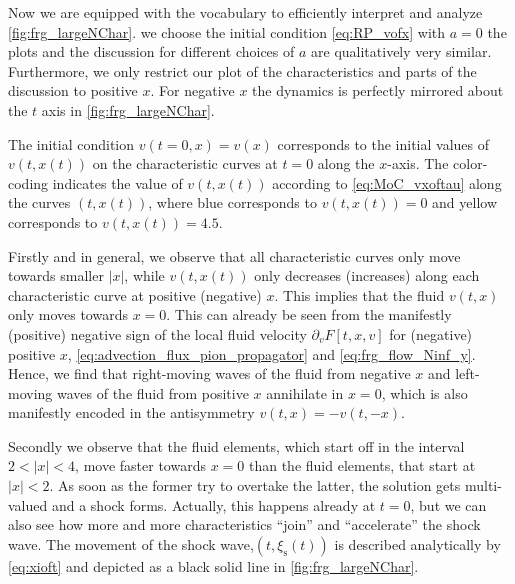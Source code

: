 Now we are equipped with the vocabulary to efficiently interpret and analyze \cref{fig:frg_largeNChar}.
\WlogA{} we choose the initial condition \eqref{eq:RP_vofx} with $a = 0$ \dash{} the plots and the discussion for different choices of $a$ are qualitatively very similar.
Furthermore, we only restrict our plot of the characteristics and parts of the discussion to positive $x$. For negative $x$ the dynamics is perfectly mirrored about the $t$ axis in \cref{fig:frg_largeNChar}.

The initial condition $v ( t = 0, x ) = v ( x )$ corresponds to the initial values of $v ( t, x ( t ) )$ on the characteristic curves at $t = 0$ along the $x$-axis. The color-coding indicates the value of $v ( t, x ( t ) )$ according to \cref{eq:MoC_vxoftau} along the curves $( t, x ( t ) )$, where {blue} corresponds to $v ( t, x ( t ) ) = 0$ and {yellow} corresponds to $v ( t, x ( t ) ) = 4.5$. 

Firstly and in general, we observe that all characteristic curves only move towards smaller $| x |$, while $v ( t, x ( t ) )$ only decreases (increases) along each characteristic curve at positive (negative) $x$. This implies that the fluid $v ( t, x)$ only moves towards $x = 0$. This can already be seen from the manifestly (positive) negative sign of the local fluid velocity $\partial_v F [ t, x, v ]$ for (negative) positive $x$, \cf{} \cref{eq:advection_flux_pion_propagator} and \cref{eq:frg_flow_Ninf_y}. Hence, we find that right-moving waves of the fluid from negative $x$ and left-moving waves of the fluid from positive $x$ annihilate in $x = 0$, which is also manifestly encoded in the antisymmetry $v ( t, x ) = - v ( t, - x)$.

Secondly we observe that the fluid elements, which start off in the interval $2 < | x | < 4$, move faster towards $x = 0$ than the fluid elements, that start at $| x | < 2$. As soon as the former try to overtake the latter, the solution gets multi-valued and a shock forms. Actually, this happens already at $t = 0$, but we can also see how more and more characteristics ``join'' and ``accelerate'' the shock wave. The movement of the shock wave,$( t, \xi_\mathrm{s} ( t ))$ is described analytically by \cref{eq:xioft} and depicted as a black solid line in \cref{fig:frg_largeNChar}.

